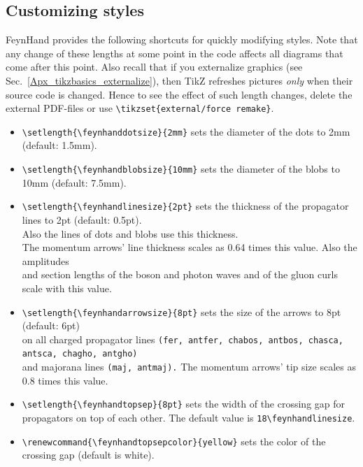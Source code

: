 \documentclass[10pt,letterpaper,twoside,notitlepage]{article}
\numberwithin{figure}{section}
\begin{document}
\subsection{Customizing styles}
\label{sec:_feynmandiagrams_customizing}
%
FeynHand provides the following shortcuts for quickly modifying styles.
Note that any change of these lengths at some point in the code
affects all diagrams that come after this point.
Also recall that if you externalize graphics (see Sec.~\ref{Apx_tikzbasics_externalize}),
then TikZ refreshes pictures \emph{only} when their source code is changed.
Hence to see the effect of such length changes, 
delete the external PDF-files or use \vercol\verb$\tikzset{external/force remake}$\txcol.
%
\begin{itemize}
	\item
	\vercol\verb$\setlength{\feynhanddotsize}{2mm}$\txcol
	sets the diameter of the dots to 2mm (default: 1.5mm).
	\item
	\vercol\verb$\setlength{\feynhandblobsize}{10mm}$\txcol
	sets the diameter of the blobs to 10mm (default: 7.5mm).
	\item
	\vercol\verb$\setlength{\feynhandlinesize}{2pt}$\txcol
	sets the thickness of the propagator lines to 2pt (default: 0.5pt).\\
	Also the lines of dots and blobs use this thickness.\\
	The momentum arrows' line thickness scales as 0.64 times this value.
	Also the amplitudes\\
	and section lengths of the boson and photon waves
	and of the gluon curls scale with this value.
	\item
	\vercol\verb$\setlength{\feynhandarrowsize}{8pt}$\txcol
	sets the size of the arrows to 8pt (default: 6pt)\\
	on all charged propagator lines
	\vercol\verb$(fer, antfer, chabos, antbos, chasca, antsca, chagho, antgho)$\txcol\\
	and majorana lines \vercol\verb$(maj, antmaj).$\txcol
	The momentum arrows' tip size scales as 0.8 times this value.
	\item
	\vercol\verb$\setlength{\feynhandtopsep}{8pt}$\txcol
	sets the width of the crossing gap for propagators on top of each other.
	The default value is \vercol\verb$18\feynhandlinesize$\txcol.
	\item
	\vercol\verb$\renewcommand{\feynhandtopsepcolor}{yellow}$\txcol
	sets the color of the crossing gap (default is white).	
\end{itemize}
%
\noindent
\end{document}

